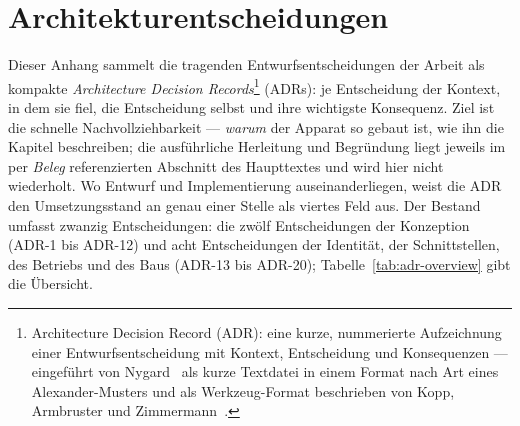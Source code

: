 \chapter{Architekturentscheidungen}\label{app:adr}

Dieser Anhang sammelt die tragenden Entwurfsentscheidungen der Arbeit als kompakte
\emph{Architecture Decision Records}\footnote{Architecture Decision Record (ADR): eine kurze, nummerierte
Aufzeichnung einer Entwurfsentscheidung mit Kontext, Entscheidung und Konsequenzen --- eingeführt von
Nygard~\cite{nygard2011adr} als kurze Textdatei in einem Format nach Art eines Alexander-Musters und als
Werkzeug-Format beschrieben von Kopp, Armbruster und Zimmermann~\cite{kopp2018madr}.} (ADRs): je
Entscheidung der Kontext, in dem sie fiel, die Entscheidung selbst und ihre wichtigste Konsequenz. Ziel
ist die schnelle Nachvollziehbarkeit --- \emph{warum} der Apparat so gebaut ist, wie ihn die Kapitel
beschreiben; die ausführliche Herleitung und Begründung liegt jeweils im per \emph{Beleg} referenzierten
Abschnitt des Haupttextes und wird hier nicht wiederholt. Wo Entwurf und Implementierung
auseinanderliegen, weist die ADR den Umsetzungsstand an genau einer Stelle als viertes Feld
aus. Der Bestand umfasst zwanzig Entscheidungen: die zwölf Entscheidungen der Konzeption (ADR-1 bis
ADR-12) und acht Entscheidungen der Identität, der Schnittstellen, des Betriebs und des Baus (ADR-13 bis
ADR-20); Tabelle~\ref{tab:adr-overview} gibt die Übersicht.

